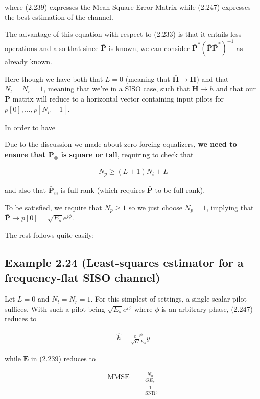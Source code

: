 \documentclass[a4paper, 12pt]{book}
\begin{document}
where (2.239) expresses the Mean-Square Error Matrix while (2.247) expresses the best estimation of the channel.

\newpage

The advantage of this equation with respect to (2.233) is that it entails less operations and also that since $\bar{\boldsymbol{P}}$ is known, we can consider $\bar{\boldsymbol{P}}^*(\bar{\boldsymbol{P}}\bar{\boldsymbol{P}}^*)^{-1}$ as already known.

Here though we have both that $L=0$ (meaning that $\bar{\boldsymbol{H}} \to \boldsymbol{H}$) and that $N_t = N_r = 1$, meaning that we're in a SISO case, such that $\boldsymbol{H} \to h$ and that our $\bar{\boldsymbol{P}}$ matrix will reduce to a horizontal vector containing input pilots for $p[0], \dots, p[N_p - 1]$.

In order to have

Due to the discussion we made about zero forcing equalizers, \textbf{we need to ensure that $\bar{\mathbf{P}}_{\otimes}$ is square or tall}, requiring to check that

\begin{align}
N_p \geq (L+1)N_t + L \tag{2.234}
\end{align}

and also that $\bar{\mathbf{P}}_{\otimes}$ is full rank (which requires $\bar{\boldsymbol{P}}$ to be full rank).

To be satisfied, we require that $N_p \geq 1$ so we just choose $N_p = 1$, implying that $\bar{\boldsymbol{P}} \to p[0] = \sqrt{E_s}e^{j\phi}$.

The rest follows quite easily:

\subsection*{Example 2.24 (Least-squares estimator for a frequency-flat SISO channel)}

Let $L=0$ and $N_t = N_r = 1$. For this simplest of settings, a single scalar pilot suffices. With such a pilot being $\sqrt{E_s}e^{j\phi}$ where $\phi$ is an arbitrary phase, (2.247) reduces to

\begin{align}
\hat{h} = \frac{e^{-j\phi}}{\sqrt{G}E_s} y \tag{2.249}
\end{align}

while $\boldsymbol{E}$ in (2.239) reduces to

\begin{align}
\text{MMSE} &= \frac{N_0}{G E_s} \tag{2.250} \\
&= \frac{1}{\text{SNR}}, \tag{2.251}
\end{align}
\end{document}
